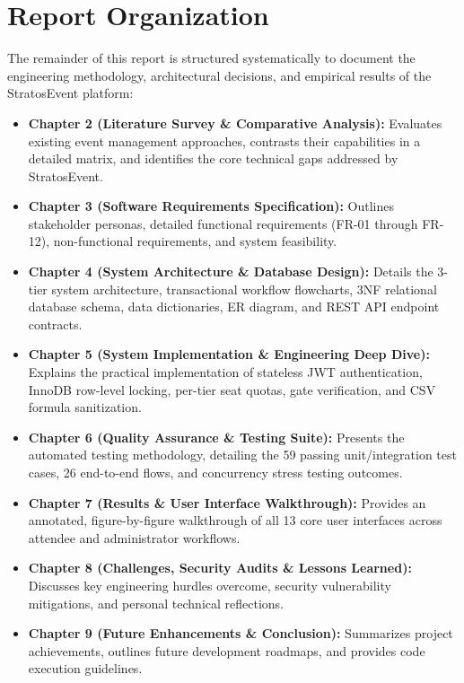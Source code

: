 \documentclass[11pt,a4paper]{report}
\begin{document}
\section{Report Organization}
\justifying
The remainder of this report is structured systematically to document the engineering methodology, architectural decisions, and empirical results of the StratosEvent platform:
\begin{itemize}[leftmargin=1.5em, itemsep=0.4em]
    \item \textbf{Chapter 2 (Literature Survey \& Comparative Analysis):} Evaluates existing event management approaches, contrasts their capabilities in a detailed matrix, and identifies the core technical gaps addressed by StratosEvent.
    \item \textbf{Chapter 3 (Software Requirements Specification):} Outlines stakeholder personas, detailed functional requirements (FR-01 through FR-12), non-functional requirements, and system feasibility.
    \item \textbf{Chapter 4 (System Architecture \& Database Design):} Details the 3-tier system architecture, transactional workflow flowcharts, 3NF relational database schema, data dictionaries, ER diagram, and REST API endpoint contracts.
    \item \textbf{Chapter 5 (System Implementation \& Engineering Deep Dive):} Explains the practical implementation of stateless JWT authentication, InnoDB row-level locking, per-tier seat quotas, gate verification, and CSV formula sanitization.
    \item \textbf{Chapter 6 (Quality Assurance \& Testing Suite):} Presents the automated testing methodology, detailing the 59 passing unit/integration test cases, 26 end-to-end flows, and concurrency stress testing outcomes.
    \item \textbf{Chapter 7 (Results \& User Interface Walkthrough):} Provides an annotated, figure-by-figure walkthrough of all 13 core user interfaces across attendee and administrator workflows.
    \item \textbf{Chapter 8 (Challenges, Security Audits \& Lessons Learned):} Discusses key engineering hurdles overcome, security vulnerability mitigations, and personal technical reflections.
    \item \textbf{Chapter 9 (Future Enhancements \& Conclusion):} Summarizes project achievements, outlines future development roadmaps, and provides code execution guidelines.
\end{itemize}
\end{document}
